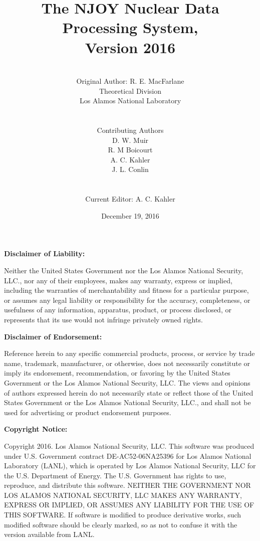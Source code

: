 \documentclass[11pt,twoside]{NJOYMan}
\title{\bf The NJOY Nuclear Data Processing System,\\Version 2016}
\author{\\
  Original Author:  R. E. MacFarlane\\
  Theoretical Division\\
  Los Alamos National Laboratory\\
\\
\\
Contributing Authors\\
D. W. Muir\\
R. M Boicourt\\
A. C. Kahler\\
J. L. Conlin\\
\\
\\
Current Editor:  A. C. Kahler
\\}
\date{December 19, 2016}
\renewcommand{\headrulewidth}{0pt}     %
\renewcommand{\footrulewidth}{0pt}}    %
\begin{document}
\maketitle
{}

\clearpage
\fancyhf{}                           %
%
\renewcommand{\headrulewidth}{0pt}   %
\renewcommand{\footrulewidth}{0pt}   %

%
\begin{center} \textbf{Disclaimer of Liability:} \end{center}
Neither the United States Government nor the Los Alamos
National Security, LLC., nor any of their employees, makes any warranty,
express or implied, including the warranties of merchantability and
fitness for a particular purpose, or assumes any legal liability or
responsibility for the accuracy, completeness, or usefulness of any
information, apparatus, product, or process disclosed, or represents
that its use would not infringe privately owned rights.

\vspace{0.25in}
\begin{center} \textbf{Disclaimer of Endorsement:} \end{center}
Reference herein to any specific commercial products,
process, or service by trade name, trademark, manufacturer, or otherwise,
does not necessarily constitute or imply its endorsement, recommendation,
or favoring by the United States Government or the Los Alamos National
Security, LLC. The views and opinions of authors expressed herein do not
necessarily state or reflect those of the United States Government or
the Los Alamos National Security, LLC., and shall not be used for
advertising or product endorsement purposes.

\vspace{0.25in}
\begin{center} \textbf{Copyright Notice:} \end{center}
Copyright 2016. Los Alamos National Security, LLC. This software was
produced under U.S. Government contract DE-AC52-06NA25396 for
Los Alamos National Laboratory (LANL), which is operated by
Los Alamos National Security, LLC for the U.S. Department of
Energy. The U.S. Government has rights to use, reproduce, and
distribute this software.  NEITHER THE GOVERNMENT NOR LOS ALAMOS
NATIONAL SECURITY, LLC MAKES ANY WARRANTY, EXPRESS OR IMPLIED, OR
ASSUMES ANY LIABILITY FOR THE USE OF THIS SOFTWARE.  If software
is modified to produce derivative works, such modified software
should be clearly marked, so as not to confuse it with the version
available from LANL.
\end{document}
